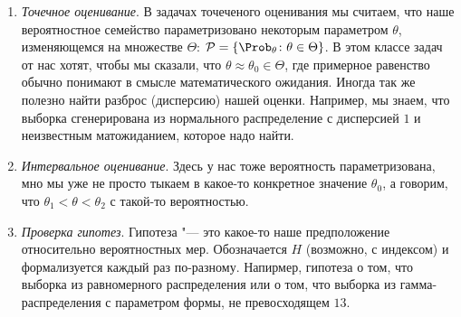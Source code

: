 \documentclass[../TV&MS.tex]{subfiles}
\begin{document}
\begin{enumerate}
    \item \textit{Точечное оценивание}. В задачах точеченого оценивания мы
        считаем, что наше вероятностное семейство параметризовано некоторым
        параметром $\theta$, изменяющемся на множестве $\Theta$:
        $\mathcal{P} = \Set{\Prob_{\theta}}{\theta \in \Theta}$.
        В этом классе задач от нас хотят, чтобы мы сказали, что 
        $\theta \approx \theta_0 \in \Theta$, где примерное равенство обычно
        понимают в смысле математического ожидания. Иногда так же полезно
        найти разброс (дисперсию) нашей оценки. Например, мы знаем, что
        выборка сгенерирована из нормального распределение с дисперсией $1$ и
        неизвестным матожиданием, которое надо найти.
    
    \item \textit{Интервальное оценивание}. Здесь у нас тоже вероятность
        параметризована, мно мы уже не просто тыкаем в какое-то конкретное
        значение $\theta_0$, а говорим, что $\theta_1 < \theta < \theta_2$ с
        такой-то вероятностью.

    \item \textit{Проверка гипотез}. Гипотеза "--- это какое-то наше
        предположение относительно вероятностных мер. Обозначается $H$ 
        (возможно, с индексом) и формализуется каждый раз по-разному.
        Напирмер, гипотеза о том, что выборка из равномерного распределения
        или о том, что выборка из гамма-распределения с параметром формы, не
        превосходящем $13$.
\end{enumerate} 
\end{document}
